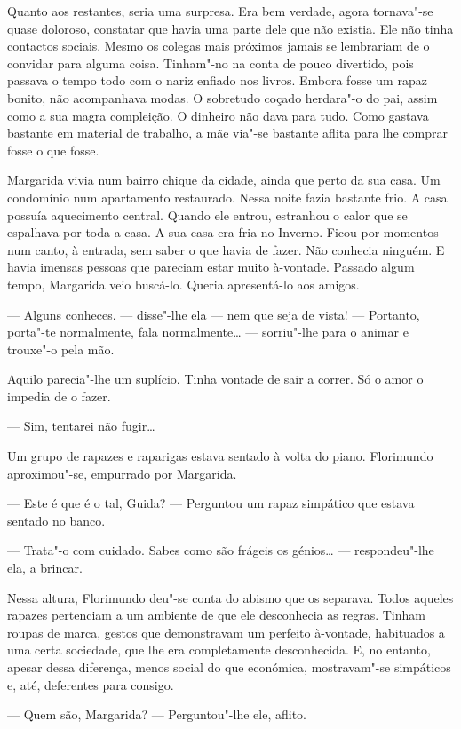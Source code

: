 Quanto aos restantes, seria uma surpresa. Era bem verdade, agora
tornava"-se quase doloroso, constatar que havia uma parte dele que não
existia. Ele não tinha contactos sociais. Mesmo os colegas mais próximos
jamais se lembrariam de o convidar para alguma coisa. Tinham"-no na conta
de pouco divertido, pois passava o tempo todo com o nariz enfiado nos
livros. Embora fosse um rapaz bonito, não acompanhava modas. O sobretudo
coçado herdara"-o do pai, assim como a sua magra compleição. O dinheiro
não dava para tudo. Como gastava bastante em material de trabalho, a mãe
via"-se bastante aflita para lhe comprar fosse o que fosse.

Margarida vivia num bairro chique da cidade, ainda que perto da sua
casa. Um condomínio num apartamento restaurado. Nessa noite fazia
bastante frio. A casa possuía aquecimento central. Quando ele entrou,
estranhou o calor que se espalhava por toda a casa. A sua casa era fria
no Inverno. Ficou por momentos num canto, à entrada, sem saber o que
havia de fazer. Não conhecia ninguém. E havia imensas pessoas que
pareciam estar muito à-vontade. Passado algum tempo, Margarida veio
buscá-lo. Queria apresentá-lo aos amigos.

--- Alguns conheces. --- disse"-lhe ela --- nem que seja de vista! --- Portanto,
porta"-te normalmente, fala normalmente\ldots{} --- sorriu"-lhe para o animar e
trouxe"-o pela mão.

Aquilo parecia"-lhe um suplício. Tinha vontade de sair a correr. Só o
amor o impedia de o fazer.

--- Sim, tentarei não fugir\ldots{}

Um grupo de rapazes e raparigas estava sentado à volta do piano.
Florimundo aproximou"-se, empurrado por Margarida.

--- Este é que é o tal, Guida? --- Perguntou um rapaz simpático que estava
sentado no banco.

--- Trata"-o com cuidado. Sabes como são frágeis os génios\ldots{} ---
respondeu"-lhe ela, a brincar.

Nessa altura, Florimundo deu"-se conta do abismo que os separava. Todos
aqueles rapazes pertenciam a um ambiente de que ele desconhecia as
regras. Tinham roupas de marca, gestos que demonstravam um perfeito
à-vontade, habituados a uma certa sociedade, que lhe era completamente
desconhecida. E, no entanto, apesar dessa diferença, menos social do que
económica, mostravam"-se simpáticos e, até, deferentes para consigo.

--- Quem são, Margarida? --- Perguntou"-lhe ele, aflito.

